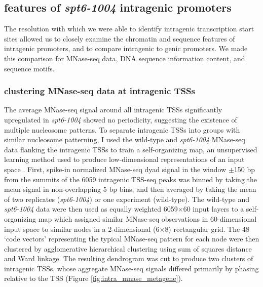 \documentclass[9pt, letterpaper]{article}
\begin{document}
\subsection{features of \textit{spt6-1004} intragenic promoters}

The resolution with which we were able to identify intragenic transcription start sites allowed us to closely examine the chromatin and sequence features of intragenic promoters, and to compare intragenic to genic promoters. We made this comparison for MNase-seq data, DNA sequence information content, and sequence motifs.

\subsubsection{clustering MNase-seq data at intragenic TSSs}

The average MNase-seq signal around all intragenic TSSs significantly upregulated in \textit{spt6-1004} showed no periodicity, suggesting the existence of multiple nucleosome patterns. To separate intragenic TSSs into groups with similar nucleosome patterning, I used the wild-type and \textit{spt6-1004} MNase-seq data flanking the intragenic TSSs to train a self-organizing map, an unsupervised learning method used to produce low-dimensional representations of an input space \cite{wehrens2007}. First, spike-in normalized MNase-seq dyad signal in the window $\pm$150 bp from the summits of the 6059 intragenic TSS-seq peaks was binned by taking the mean signal in non-overlapping 5 bp bins, and then averaged by taking the mean of two replicates (\textit{spt6-1004}) or one experiment (wild-type). The wild-type and \textit{spt6-1004} data were then used as equally weighted 6059$\times$60 input layers to a self-organizing map which assigned similar MNase-seq observations in 60-dimensional input space to similar nodes in a 2-dimensional (6$\times$8) rectangular grid. The 48 `code vectors' representing the typical MNase-seq pattern for each node were then clustered by agglomerative hierarchical clustering using sum of squares distance and Ward linkage. The resulting dendrogram was cut to produce two clusters of intragenic TSSs, whose aggregate MNase-seq signals differed primarily by phasing relative to the TSS (Figure \ref{fig:intra_mnase_metagene}).
\end{document}
